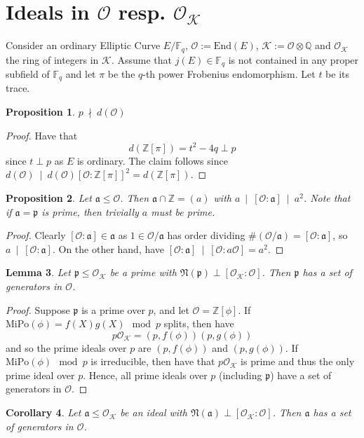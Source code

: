 \documentclass{scrartcl}
\newcommand{\N}{\mathbb{N}}
\newcommand{\Z}{\mathbb{Z}}
\newcommand{\F}{\mathbb{F}}
\newcommand{\End}{\mathrm{End}}
\newcommand{\divides}{\ \mid \ }
\newcommand{\notdivides}{\ \nmid \ }
\newcommand{\K}{\mathcal{K}}
\newcommand{\p}{\mathfrak{p}}
\renewcommand{\a}{\mathfrak{a}}
\renewcommand{\O}{\mathcal{O}}
\renewcommand{\N}{\mathfrak{N}}
\newtheorem{prop}{Proposition}[section]
\newtheorem{lemma}[prop]{Lemma}
\newtheorem{corollary}[prop]{Corollary}
\theoremstyle{definition}
\begin{document}
\section{Ideals in $\O$ resp. $\O_\K$}
Consider an ordinary Elliptic Curve $E/\F_q$, $\O := \End(E)$, $\K := \O \otimes \mathbb{Q}$ and $\O_\K$ the ring of integers in $\K$.
Assume that $j(E) \in \F_q$ is not contained in any proper subfield of $\F_q$ and let $\pi$ be the $q$-th power Frobenius endomorphism.
Let $t$ be its trace.
\begin{prop}
    $p \notdivides d(\O)$
\end{prop}
\begin{proof}
    Have that 
    \begin{equation*}
        d(\Z[\pi]) = t^2 - 4q \perp p
    \end{equation*}
    since $t \perp p$ as $E$ is ordinary.
    The claim follows since $d(\O) \divides d(\O) [\O : \Z[\pi]]^2 = d(\Z[\pi])$.
\end{proof}
\begin{prop}
    Let $\a \leq \O$. Then $\a \cap \Z = (a)$ with $a \divides [\O : \a] \divides a^2$.
    Note that if $\a = \p$ is prime, then trivially $a$ must be prime.
\end{prop}
\begin{proof}
    Clearly $[\O : \a] \in \a$ as $1 \in \O/\a$ has order dividing $\#(\O/\a) = [\O : \a]$, so $a \divides [\O : \a]$.
    On the other hand, have $[\O : \a] \divides [\O : a\O] = a^2$.
\end{proof}
\begin{lemma}
    Let $\p \leq \O_\K$ be a prime with $\N(\p) \perp [\O_\K : \O]$.
    Then $\p$ has a set of generators in $\O$.
\end{lemma}
\begin{proof}
    Suppose $\p$ is a prime over $p$, and let $\O = \Z[\phi]$.
    If $\mathrm{MiPo}(\phi) = f(X)g(X) \mod p$ splits, then have
    \begin{equation*}
        p\O_\K = (p, f(\phi))(p, g(\phi))
    \end{equation*}
    and so the prime ideals over $p$ are $(p, f(\phi))$ and $(p, g(\phi))$.
    If $\mathrm{MiPo}(\phi) \mod p$ is irreducible, then have that $p\O_\K$ is prime and thus the only prime ideal over $p$.
    Hence, all prime ideals over $p$ (including $\p$) have a set of generators in $\O$.
\end{proof}
\begin{corollary}
    \label{prop:generators_in_order}
    Let $\a \leq \O_\K$ be an ideal with $\N(\a) \perp [\O_\K : \O]$. Then $\a$ has a set of generators in $\O$.
\end{corollary}
\end{document}
